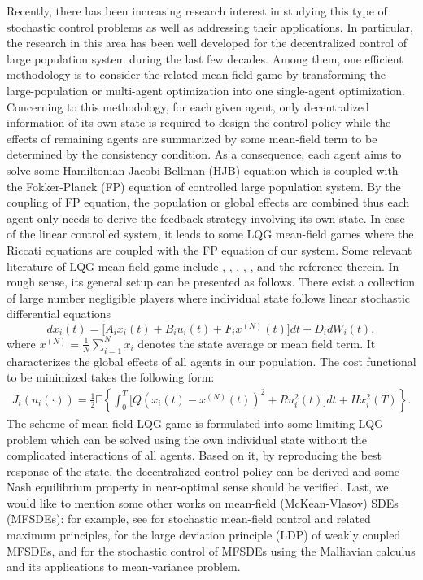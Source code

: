 \documentclass[11pt]{article}
\begin{document}
Recently, there has been increasing research interest in studying
this type of stochastic control problems as well as addressing their
applications. In particular, the research in this area has been well
developed for the decentralized control of large population system
during the last few decades. Among them, one efficient methodology
is to consider the related mean-field game by transforming the
large-population or multi-agent optimization into one single-agent
optimization. Concerning to this methodology, for each given agent,
only decentralized information of its own state is required to
design the control policy while the effects of remaining agents are
summarized by some mean-field term to be determined by the
consistency condition. As a consequence, each agent aims to solve
some Hamiltonian-Jacobi-Bellman (HJB) equation which is coupled with
the Fokker-Planck (FP) equation of controlled large population
system. By the coupling of FP equation, the population or global
effects are combined thus each agent only needs to derive the
feedback strategy involving its own state. In case of the linear
controlled system, it leads to some LQG mean-field games where the
Riccati equations are coupled with the FP equation of our system.
Some relevant literature of LQG mean-field game include \cite{B
2013}, \cite{H 2010}, \cite{H-M-C 2006}, \cite{H-C-M 2007},
\cite{L-L 2007}, \cite{N-H 2012} and the reference therein. In rough
sense, its general setup can be presented as follows. There exist a
collection of large number negligible players where individual state
follows linear stochastic differential equations
%
\begin{equation}\label{eq:1-1}
 dx_i(t)=\big[A_i x_i(t)+B_i u_i(t)+F_i x^{(N)}(t)\big]dt+D_idW_{i}(t),
 \end{equation}
%
where $x^{(N)}=\frac{1}{N}\sum\limits_{i=1}^{N}x_i$ denotes the
state average or mean
 field term. It characterizes the global effects of all agents in our population. The cost
 functional to be minimized takes the following form:
%
\begin{eqnarray*}
 J_{i}(u_i(\cdot)) = \frac{1}{2}\mathbb{E}\left\{\int_0^{T}\Big[Q(x_i(t)-x^{(N)}(t))^2
+Ru^2_i(t)\Big]dt+Hx_i^{2}(T)\right\}.
\end{eqnarray*}
%
The scheme of mean-field LQG game is formulated into some limiting LQG problem
 which can be solved using the own individual state without the complicated interactions
 of all agents. Based on it, by reproducing the best response of the state,
 the decentralized control policy can be derived and some Nash equilibrium property
  in near-optimal sense should be verified. Last, we would
  like to mention some other works on mean-field (McKean-Vlasov) SDEs (MFSDEs): for example, see \cite{AD 2010} \cite{BDL 2011} for stochastic mean-field control and related maximum principles, \cite{BDF 2012} for the large deviation principle (LDP) of weakly coupled MFSDEs,
  and \cite{MOZ 2012} for the stochastic control of MFSDEs using the Malliavian calculus and its applications to mean-variance problem.
\end{document}
